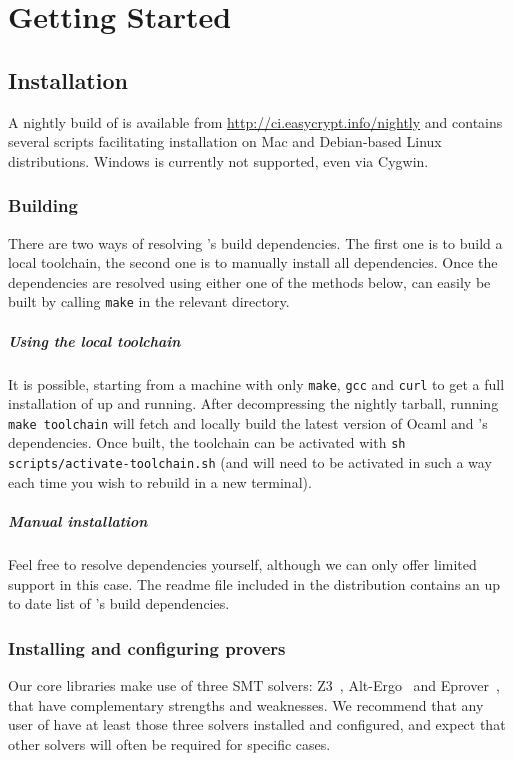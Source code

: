 
\chapter{Getting Started}
\section{Installation}
A nightly build of \EC is available from \url{http://ci.easycrypt.info/nightly}
and contains several scripts facilitating installation on Mac and Debian-based
Linux distributions. Windows is currently not supported, even via Cygwin.

\subsection{Building \EC}
There are two ways of resolving \EC's build dependencies. The first one is to
build a local toolchain, the second one is to manually install all dependencies.
Once the dependencies are resolved using either one of the methods below,
\EC can easily be built by calling \texttt{make} in the relevant directory.

\paragraph{Using the local toolchain}
It is possible, starting from a machine with only \texttt{make}, \texttt{gcc}
and \texttt{curl} to get a full installation of \EC up and running. After
decompressing the nightly tarball, running \texttt{make toolchain} will fetch
and locally build the latest version of Ocaml and \EC's dependencies. Once
built, the toolchain can be activated with \texttt{sh scripts/activate-toolchain.sh}
(and will need to be activated in such a way each time you wish to rebuild \EC
in a new terminal).

\paragraph{Manual installation}
Feel free to resolve dependencies yourself, although we can only offer limited
support in this case. The readme file included in the distribution contains an
up to date list of \EC's build dependencies.

\subsection{Installing and configuring provers}
Our core libraries make use of three SMT solvers: Z3~\cite{}, Alt-Ergo~\cite{}
and Eprover~\cite{}, that have complementary strengths and weaknesses. We
recommend that any user of \EC have at least those three solvers installed and
configured, and expect that other solvers will often be required for specific
cases.

